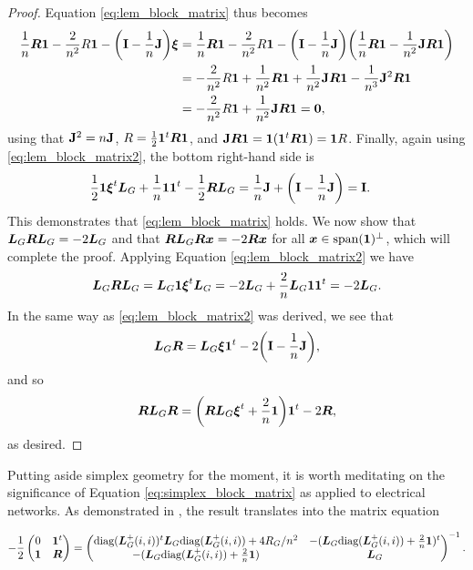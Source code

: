 \begin{proof}
Equation \eqref{eq:lem_block_matrix} thus becomes 
\begin{align*}
\frac{1}{n}\vb*{R}\vb{1} -\frac{2}{n^2}R \vb{1} - \bigg(\vb{I}-\frac{1}{n}\vb{J}\bigg)\vb*{\xi} &= \frac{1}{n}\vb*{R}\vb{1} - \frac{2}{n^2}R\vb{1} - \bigg(\vb{I}-\frac{1}{n}\vb{J}\bigg)\bigg(\frac{1}{n}\vb*{R}\vb{1} - \frac{1}{n^2}\vb{J}\vb*{R}\vb{1}\bigg) \\
&= -\frac{2}{n^2} R\vb{1} + \frac{1}{n^2}\vb*{R}\vb{1} + \frac{1}{n^2}\vb{J}\vb*{R}\vb{1} - \frac{1}{n^3}\vb{J}^2\vb*{R}\vb{1} \\
&= -\frac{2}{n^2} R\vb{1} +\frac{1}{n^2} \vb{J}\vb*{R}\vb{1} = \vb{0},
\end{align*}
using that $\vb{J}^2 = n \vb{J}$, $R=\frac{1}{2}\vb{1}^t \vb*{R}\vb{1}$, and $\vb{J}\vb*{R}\vb{1} = \vb{1}(\vb{1}^t \vb*{R}\vb{1}) = \vb{1} R$. Finally, again using \eqref{eq:lem_block_matrix2}, the bottom right-hand side is 
\begin{align*}
\frac{1}{2}\vb{1} \vb*{\xi}^t \vb*{L}_G + \frac{1}{n}\vb{1}\vb{1}^t - \frac{1}{2}\vb*{R}\vb*{L}_G &= \frac{1}{n}\vb{J} + \bigg(\vb{I}-\frac{1}{n}\vb{J}\bigg) = \vb{I}.
\end{align*}
This demonstrates that \eqref{eq:lem_block_matrix} holds. We now show that $\vb*{L}_G \vb*{R}\vb*{L}_G = -2 \vb*{L}_G$ and that $\vb*{R}\vb*{L}_G\vb*{R}\vb*{x} = -2\vb*{R}\vb*{x}$ for all $\vb*{x}\in\textnormal{span}(\vb{1})^\perp$, which will complete the proof. Applying Equation \eqref{eq:lem_block_matrix2} we have 
\begin{align*}
\vb*{L}_G\vb*{R}\vb*{L}_G = \vb*{L}_G\vb{1} \vb*{\xi}^t\vb*{L}_G = -2\vb*{L}_G+ \frac{2}{n}\vb*{L}_G\vb{1}\vb{1}^t = -2\vb*{L}_G.
\end{align*}
In the same way as \eqref{eq:lem_block_matrix2} was derived, we see that 
\begin{equation*}
\vb*{L}_G\vb*{R} = \vb*{L}_G\vb*{\xi}\vb{1}^t - 2\bigg(\vb{I}-\frac{1}{n}\vb{J}\bigg),
\end{equation*}
and so 
\begin{equation*}
\vb*{R}\vb*{L}_G\vb*{R}= \bigg(\vb*{R}\vb*{L}_G\vb*{\xi}^t + \frac{2}{n}\vb{1} \bigg)\vb{1}^t -2\vb*{R},
\end{equation*}
as desired. 
\end{proof}

Putting aside simplex geometry for the moment, it is worth meditating on the significance of Equation \eqref{eq:simplex_block_matrix} as applied to electrical networks. As demonstrated in \cite{van2017pseudoinverse}, the result translates into the matrix equation 

\begin{equation}
\label{eq:block_inverse}
-\frac{1}{2}\begin{pmatrix}
0 & \vb{1}^t \\
\vb{1} & \vb*{R}
\end{pmatrix} = 
\begin{pmatrix}
\text{diag}(\vb*{L}_G^+(i,i))^t  \vb*{L}_G \text{diag}(\vb*{L}_G^+(i,i))  + 4R_G/n^2
&  -(\vb*{L}_G\text{diag}(\vb*{L}_G^+(i,i)) + \frac{2}{n}\vb{1} )^t \\
-(\vb*{L}_G\text{diag}(\vb*{L}_G^+(i,i)) + \frac{2}{n}\vb{1} ) 
& \vb*{L}_G
\end{pmatrix}^{-1}.
\end{equation}

